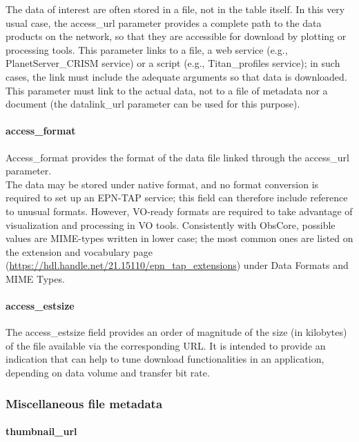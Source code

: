 \documentclass[11pt,a4paper]{ivoa}
\begin{document}
The data of interest are often stored in a file, not in the table itself.
In this very usual case, the access\_url parameter provides
a complete path to the data products on the network, so that they are
accessible for download by plotting or processing tools.
This parameter links to a file, a web service (e.g., PlanetServer\_CRISM
service) or a script (e.g., Titan\_profiles service); in such cases,
the link must include the adequate arguments so that data is downloaded.
This parameter must link to the actual data, not to a file of
metadata nor a document (the datalink\_url parameter can be
used for this purpose).

\paragraph{access\_format}

Access\_format provides the format of the data file linked through
the access\_url parameter. \\The data may be stored under native
format, and no format conversion is required to set up an EPN-TAP
service; this field can therefore include reference to unusual
formats. However, VO-ready formats are required to take advantage
of visualization and processing in VO tools. Consistently with
ObsCore, possible values are MIME-types written in lower case;
the most common ones are listed on the extension and vocabulary
page (\url{https://hdl.handle.net/21.15110/epn_tap_extensions}) under Data Formats and MIME Types.

\paragraph{access\_estsize}

The access\_estsize field provides an order of magnitude of the size (in
kilobytes) of the file available via the corresponding URL. It is intended
to provide an indication that can help to tune download functionalities
in an application, depending on data volume and transfer bit rate.


\subsubsection{Miscellaneous file metadata}


\paragraph{thumbnail\_url}
\end{document}
